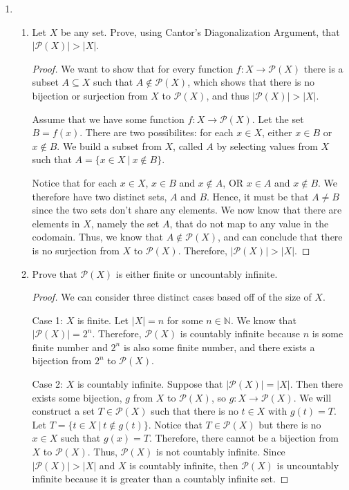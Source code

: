 \documentclass[12pt]{article}
\newcommand{\N}{\mathbb{N}}
\begin{document}
\begin{enumerate}
\begin{enumerate}
\end{enumerate}

\item \begin{enumerate}
\item Let $X$ be any set. Prove, using Cantor's Diagonalization Argument, that $|\mathcal{P}(X)|>|X|$.

\begin{proof}
We want to show that for every function $f:X \to \mathcal{P}(X)$ there is a subset $A \subseteq X$ such that $A \notin \mathcal{P}(X)$, which shows that there is no bijection or surjection from $X$ to $\mathcal{P}(X)$, and thus $|\mathcal{P}(X)|>|X|$. 

Assume that we have some function $f:X \to \mathcal{P}(X)$. Let the set $B = f(x)$. There are two possibilites: for each $x \in X$, either $x \in B$ or $x \notin B$. We build a subset from $X$, called $A$ by selecting values from $X$ such that $A = \{x \in X\ |\ x \notin B\}$.

Notice that for each $x \in X$, $x\in B$ and $x \notin A$, OR $x\in A$ and $x \notin B$. We therefore have two distinct sets, $A$ and $B$. Hence, it must be that $A \neq B$ since the two sets don't share any elements. We now know that there are elements in $X$, namely the set $A$, that do not map to any value in the codomain. Thus, we know that $A \notin \mathcal{P}(X)$, and can conclude that there is no surjection from $X$ to $\mathcal{P}(X)$. Therefore, $|\mathcal{P}(X)|>|X|$. 
\end{proof}

\item Prove that $\mathcal{P}(X)$ is either finite or uncountably infinite.
\begin{proof}
We can consider three distinct cases based off of the size of $X$. 

Case 1: $X$ is finite. Let $|X| = n$ for some $n \in \N$. We know that $|\mathcal{P}(X)| = 2^n$. Therefore, $\mathcal{P}(X)$ is countably infinite because $n$ is some finite number and $2^n$ is also some finite number, and there exists a bijection from $2^n$ to $\mathcal{P}(X)$. 

Case 2: $X$ is countably infinite. Suppose that $|\mathcal{P}(X)| = |X|$. Then there exists some bijection, $g$ from $X$ to $\mathcal{P}(X)$, so $g:X \to \mathcal{P}(X)$. We will construct a set $T \in \mathcal{P}(X)$ such that there is no $t \in X$ with $g(t) = T$. Let $T = \{t \in X\ |\ t \notin g(t)\}$. Notice that $T \in \mathcal{P}(X)$ but there is no $x \in X$ such that $g(x) = T$. Therefore, there cannot be a bijection from $X$ to $\mathcal{P}(X)$. Thus, $\mathcal{P}(X)$ is not countably infinite. Since $|\mathcal{P}(X)| > |X|$ and $X$ is countably infinite, then $\mathcal{P}(X)$ is uncountably infinite because it is greater than a countably infinite set. 


\end{proof}
\end{enumerate}
\end{enumerate}
\end{document}
